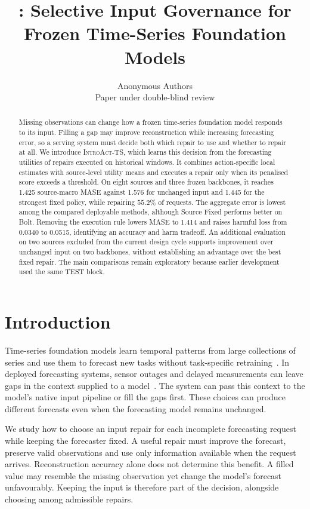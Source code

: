 \documentclass{article}
\title{\introact{}: Selective Input Governance for \\
Frozen Time-Series Foundation Models}
\author{Anonymous Authors\\Paper under double-blind review}
\newcommand{\introact}{\textsc{IntroAct-TS}}
\begin{document}
\maketitle

\begin{abstract}
Missing observations can change how a frozen time-series foundation model responds to its
input. Filling a gap may improve reconstruction while increasing forecasting error, so a
serving system must decide both which repair to use and whether to repair at all.
We introduce \introact{}, which learns this decision from the forecasting utilities of
repairs executed on historical windows. It combines action-specific local estimates with
source-level utility means and executes a repair only when its penalised score exceeds a
threshold. On eight sources and three frozen backbones, it reaches 1.425 source-macro MASE
against 1.576 for unchanged input and 1.445 for the strongest fixed policy, while repairing
$55.2\%$ of requests. The aggregate error is lowest among the compared deployable methods,
although Source Fixed performs better on Bolt. Removing the execution rule lowers MASE to
1.414 and raises harmful loss from 0.0340 to 0.0515, identifying an accuracy and harm tradeoff.
An additional evaluation on two sources excluded from the current design cycle supports
improvement over unchanged input on two backbones, without establishing an advantage over
the best fixed repair. The main comparisons remain exploratory because earlier development
used the same TEST block.
\end{abstract}

\section{Introduction}
\label{sec:intro}
Time-series foundation models learn temporal patterns from large collections of series and
use them to forecast new tasks without task-specific
retraining~\citep{ansari2024chronos,chronosbolt2025,das2024timesfm,woo2024moirai,chronos2_2025}.
In deployed forecasting systems, sensor outages and delayed measurements can leave gaps in
the context supplied to a model~\citep{chen2024bitgraph,peng2025s4m}. The system can pass
this context to the model's native input pipeline or fill the gaps first. These choices
can produce different forecasts even when the forecasting model remains unchanged.

We study how to choose an input repair for each incomplete forecasting request while keeping
the forecaster fixed. A useful repair must improve the forecast, preserve valid observations
and use only information available when the request arrives. Reconstruction accuracy alone
does not determine this benefit. A filled value may resemble the missing observation yet
change the model's forecast unfavourably. Keeping the input is therefore part of the decision,
alongside choosing among admissible repairs.
\end{document}
